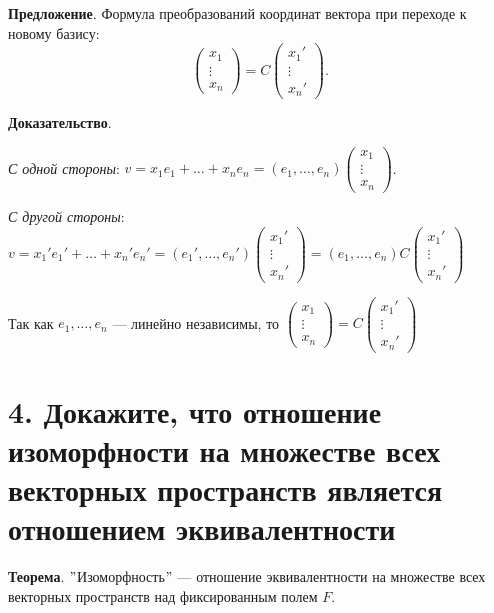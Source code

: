 \documentclass[a4paper, 12pt]{article}
\begin{document}
\vspace{3mm}
\textbf{Предложение}. Формула преобразований координат вектора при переходе к новому базису:
\vspace{-3mm}
\[
\begin{pmatrix}x_1 \\ \vdots \\ x_n \end{pmatrix} = C \begin{pmatrix} x_1' \\ \vdots \\ x_n' \end{pmatrix}.
\]

\textbf{Доказательство}.

\textit{С одной стороны}: $v = x_1e_1 + \ldots + x_ne_n = (e_1, \ldots, e_n) \begin{pmatrix}x_1 \\ \vdots \\ x_n \end{pmatrix}$.

\textit{С другой стороны}: $v = x_1'e_1' + \ldots + x_n'e_n' = (e_1', \ldots, e_n') \begin{pmatrix}x_1' \\ \vdots \\ x_n' \end{pmatrix} = (e_1, \ldots, e_n)C \begin{pmatrix}x_1' \\ \vdots \\ x_n' \end{pmatrix}$

Так как $e_1, \ldots, e_n$ --- линейно независимы, то $\begin{pmatrix} x_1 \\ \vdots \\ x_n\end{pmatrix} = C \begin{pmatrix} x_1' \\ \vdots \\ x_n'\end{pmatrix}$

\section*{4. Докажите, что отношение изоморфности на множестве всех векторных пространств является отношением эквивалентности}
\textbf{Теорема}. $"$Изоморфность$"$ --- отношение эквивалентности на множестве всех векторных пространств над фиксированным полем $F$.
\end{document}
